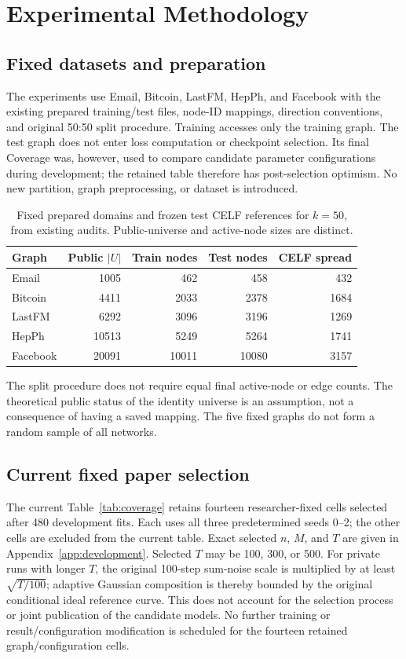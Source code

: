 \chapter{Experimental Methodology}\label{ch:design}
\section{Fixed datasets and preparation}
The experiments use Email, Bitcoin, LastFM, HepPh, and Facebook with the existing prepared training/test files, node-ID mappings, direction conventions, and original 50:50 split procedure. Training accesses only the training graph. The test graph does not enter loss computation or checkpoint selection. Its final Coverage was, however, used to compare candidate parameter configurations during development; the retained table therefore has post-selection optimism. No new partition, graph preprocessing, or dataset is introduced.

\begin{table}[htbp]
\centering\small
\caption{Fixed prepared domains and frozen test CELF references for $k=50$, from existing audits. Public-universe and active-node sizes are distinct.}\label{tab:datasets}
\begin{tabular}{lrrrr}\toprule
Graph & Public $|U|$ & Train nodes & Test nodes & CELF spread\\\midrule
Email & 1005 & 462 & 458 & 432\\
Bitcoin & 4411 & 2033 & 2378 & 1684\\
LastFM & 6292 & 3096 & 3196 & 1269\\
HepPh & 10513 & 5249 & 5264 & 1741\\
Facebook & 20091 & 10011 & 10080 & 3157\\\bottomrule
\end{tabular}
\end{table}

The split procedure does not require equal final active-node or edge counts. The theoretical public status of the identity universe is an assumption, not a consequence of having a saved mapping. The five fixed graphs do not form a random sample of all networks.

\section{Current fixed paper selection}
The current Table~\ref{tab:coverage} retains fourteen researcher-fixed cells selected after 480 development fits. Each uses all three predetermined seeds 0--2; the other cells are excluded from the current table. Exact selected $n$, $M$, and $T$ are given in Appendix~\ref{app:development}. Selected $T$ may be 100, 300, or 500. For private runs with longer $T$, the original 100-step sum-noise scale is multiplied by at least $\sqrt{T/100}$; adaptive Gaussian composition is thereby bounded by the original conditional ideal reference curve. This does not account for the selection process or joint publication of the candidate models. No further training or result/configuration modification is scheduled for the fourteen retained graph/configuration cells.

